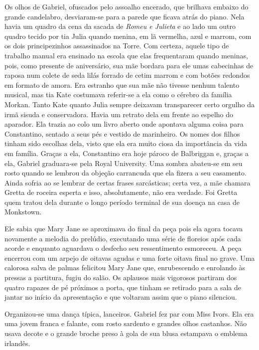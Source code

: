 Os olhos de Gabriel, ofuscados pelo assoalho encerado, que brilhava embaixo do
grande candelabro, desviaram-se para a parede que ficava atrás do piano.  Nela
havia um quadro da cena da sacada de \textit{Romeu e Julieta} e ao lado um
outro quadro tecido por tia Julia quando menina, em lã vermelha, azul e marrom,
com os dois principezinhos assassinados na Torre.  Com certeza, aquele tipo de
trabalho manual era ensinado na escola que elas frequentaram quando meninas,
pois, como presente de aniversário, sua mãe bordara para ele umas cabecinhas de
raposa num colete de seda lilás forrado de cetim marrom e com botões redondos
em formato de amora.  Era estranho que sua mãe não tivesse nenhum talento
musical, mas tia Kate costumava referir-se a ela como o cérebro da família
Morkan.  Tanto Kate quanto Julia sempre deixavam transparecer certo orgulho da
irmã sisuda e conservadora.  Havia um retrato dela em frente ao espelho do
aparador.  Ela trazia ao colo um livro aberto onde apontava alguma coisa para
Constantino, sentado a seus pés e vestido de marinheiro.  Os nomes dos filhos
tinham sido escolhas dela, visto que ela era muito ciosa da importância da vida
em família.  Graças a ela, Constantino era hoje pároco de Balbriggan e, graças
a ela, Gabriel graduara-se pela Royal University.  Uma sombra abateu-se em seu
rosto quando se lembrou da objeção carrancuda que ela fizera a seu casamento.
Ainda sofria ao se lembrar de certas frases sarcásticas; certa vez, a mãe
chamara Gretta de roceira esperta e isso, absolutamente, não era verdade.  Foi
Gretta quem tratou dela durante o longo período terminal de sua doença na casa
de Monkstown.

Ele sabia que Mary Jane se aproximava do final da peça pois ela agora tocava
novamente a melodia do prelúdio, executando uma série de floreios após cada
acorde e enquanto aguardava o desfecho seu ressentimento esmoreceu.  A peça
encerrou com um arpejo de oitavas agudas e uma forte oitava final no grave.
Uma calorosa salva de palmas felicitou Mary Jane que, enrubescendo e enrolando
às pressas a partitura, fugiu do salão.  Os aplausos mais vigorosos partiram
dos quatro rapazes de pé próximos a porta, que tinham se retirado para a sala
de jantar no início da apresentação e que voltaram assim que o piano silenciou.

Organizou-se uma dança típica, lanceiros.  Gabriel fez par com Miss Ivors.  Ela
era uma jovem franca e falante, com rosto sardento e grandes olhos castanhos.
Não usava decote e o grande broche preso à gola de sua blusa estampava o
emblema irlandês.


